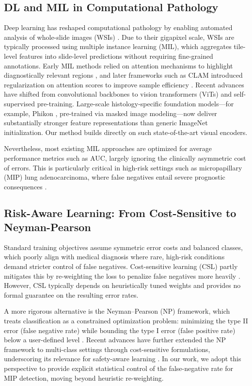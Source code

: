 \documentclass[journal,twoside,web]{ieeecolor}
\begin{document}
\subsection{DL and MIL in Computational Pathology}

Deep learning has reshaped computational pathology by enabling automated analysis of whole-slide images (WSIs) \cite{coudray2018classification, campanella2019clinical}. Due to their gigapixel scale, WSIs are typically processed using multiple instance learning (MIL), which aggregates tile-level features into slide-level predictions without requiring fine-grained annotations.  Early MIL methods relied on attention mechanisms to highlight diagnostically relevant regions \cite{ilse2018attention}, and later frameworks such as CLAM introduced regularization on attention scores to improve sample efficiency \cite{lu2021data}. Recent advances have shifted from convolutional backbones to vision transformers (ViTs) and self-supervised pre-training. Large-scale histology-specific foundation models—for example, Phikon \cite{filiot2023scaling}, pre-trained via masked image modeling—now deliver substantially stronger feature representations than generic ImageNet initialization. Our method builds directly on such state-of-the-art visual encoders.

Nevertheless, most existing MIL approaches are optimized for average performance metrics such as AUC, largely ignoring the clinically asymmetric cost of errors. This is particularly critical in high-risk settings such as micropapillary (MIP) lung adenocarcinoma, where false negatives entail severe prognostic consequences \cite{caso2020underlying, dai2017tumor}.

\subsection{Risk-Aware Learning: From Cost-Sensitive to Neyman-Pearson}

Standard training objectives assume symmetric error costs and balanced classes, which poorly align with medical diagnosis where rare, high-risk conditions demand stricter control of false negatives. Cost-sensitive learning (CSL) partly mitigates this by re-weighting the loss to penalize false negatives more heavily \cite{el2010foundations,he2009learning}. However, CSL typically depends on heuristically tuned weights and provides no formal guarantee on the resulting error rates.

A more rigorous alternative is the Neyman–Pearson (NP) framework, which treats classification as a constrained optimization problem: minimizing the type II error (false negative rate) while bounding the type I error (false positive rate) below a user-defined level \cite{rigollet2011neyman,tong2018neyman}. Recent advances have further extended the NP framework to multi-class settings through cost-sensitive formulations, underscoring its relevance for safety-aware learning \cite{tian2025neyman}. In our work, we adopt this perspective to provide explicit statistical control of the false-negative rate for MIP detection, moving beyond heuristic re-weighting.
\end{document}
